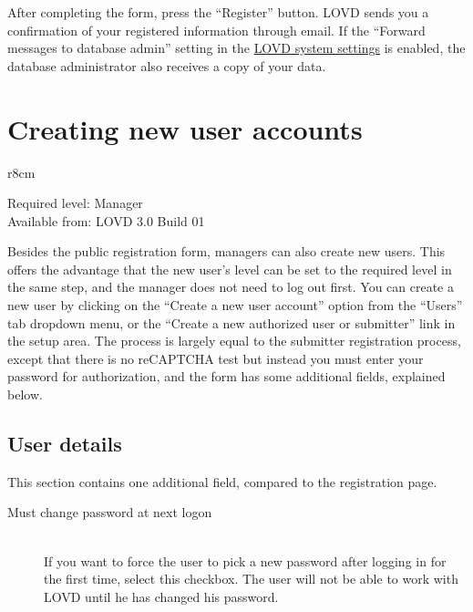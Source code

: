 After completing the form, press the ``Register'' button.
LOVD sends you a confirmation of your registered information through email.
If the ``Forward messages to database admin'' setting in the \hyperlink{sec:system_settings}{LOVD system settings} is enabled,
 the database administrator also receives a copy of your data.





\section{Creating new user accounts}
\begin{wrapfigure}[3]{r}{8cm} %
  \vspace{-25pt}
  \begin{leftbar}
    Required level: Manager\\
    Available from: LOVD 3.0 Build 01
  \end{leftbar}
\end{wrapfigure}
Besides the public registration form, managers can also create new users.
This offers the advantage that the new user's level can be set to the required level in the same step, and the manager does not need to log out first.
You can create a new user by clicking on the ``Create a new user account'' option from the ``Users'' tab dropdown menu,
 or the ``Create a new authorized user or submitter'' link in the setup area.
The process is largely equal to the submitter registration process, except that there is no reCAPTCHA test but
 instead you must enter your password for authorization, and the form has some additional fields, explained below.



\subsection{User details}
This section contains one additional field, compared to the registration page.
\begin{description}
  \item[Must change password at next logon] \hfill \\
  If you want to force the user to pick a new password after logging in for the first time, select this checkbox.
  The user will not be able to work with LOVD until he has changed his password.
\end{description}



